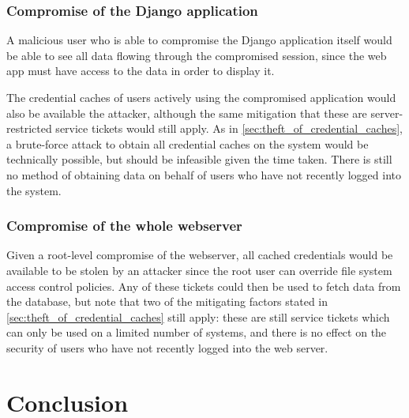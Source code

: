 \documentclass{report}
\begin{document}
\subsection{Compromise of the Django application}
A malicious user who is able to compromise the Django application itself would be able to see all data flowing through the compromised session, since the web app must have access to the data in order to display it.

The credential caches of users actively using the compromised application would also be available the attacker, although the same mitigation that these are server-restricted service tickets would still apply. As in \autoref{sec:theft_of_credential_caches}, a brute-force attack to obtain all credential caches on the system would be technically possible, but should be infeasible given the time taken. There is still no method of obtaining data on behalf of users who have not recently logged into the system.

\subsection{Compromise of the whole webserver}
Given a root-level compromise of the webserver, all cached credentials would be available to be stolen by an attacker since the root user can override file system access control policies. Any of these tickets could then be used to fetch data from the database, but note that two of the mitigating factors stated in \autoref{sec:theft_of_credential_caches} still apply: these are still service tickets which can only be used on a limited number of systems, and there is no effect on the security of users who have not recently logged into the web server.


\chapter{Conclusion}
\end{document}
